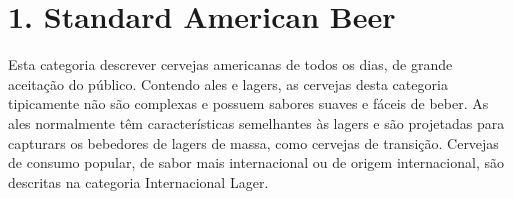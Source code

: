 \section*{1. Standard American Beer}

Esta categoria descrever cervejas americanas de todos os dias, de grande
aceitação do público. Contendo ales e lagers, as cervejas desta
categoria tipicamente não são complexas e possuem sabores suaves e
fáceis de beber. As ales normalmente têm características semelhantes às
lagers e são projetadas para capturars os bebedores de lagers de massa,
como cervejas de transição. Cervejas de consumo popular, de sabor mais
internacional ou de origem internacional, são descritas na categoria
Internacional Lager.